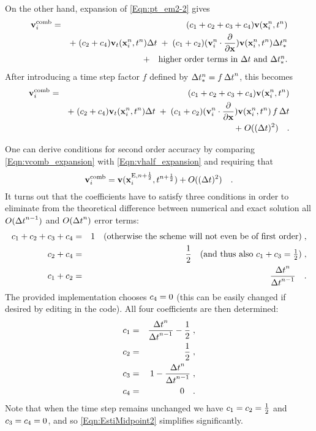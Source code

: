 \begin{itemize}
On the other hand, expansion of \eqref{Eqn:pt_em2-2} gives
\begin{eqnarray}
{\bf v}_i^{\mathrm{comb}} &=& 
(c_1+c_2+c_3+c_4) {\bf v}({\bf x}_i^{n},t^{n}) \nonumber\\
&& +\;
   (c_2 +    c_4) {\bf v}_t({\bf x}_i^{n},t^{n}) {\Delta t} \;+\;
  (c_1+c_2 )  ({\bf v}_i^{n} \cdot \frac{\partial}{\partial {\bf x}}) {\bf v}({\bf x}_i^{n},t^{n}) \Delta t_{*}^{n}  \nonumber\\
&& \quad +    \quad    \mbox{higher order terms in ${\Delta t}$ and $\Delta t_{*}^{n}$.} \nonumber
\end{eqnarray}
After introducing a  time step factor $f$ defined by
$\Delta t_{*}^{n} = f\,{\Delta t}^{n}$, this becomes
\begin{eqnarray}
    \label{Eqn:vcomb_expansion}
{\bf v}_i^{\mathrm{comb}} &=& 
(c_1+c_2+c_3+c_4) {\bf v}({\bf x}_i^{n},t^{n}) \\
&& +\;
   (c_2 +    c_4) {\bf v}_t({\bf x}_i^{n},t^{n}) {\Delta t} \;+\;
  (c_1+c_2 )({\bf v}_i^{n} \cdot \frac{\partial}{\partial {\bf x}}) {\bf v}({\bf x}_i^{n},t^{n}) \,f\,{\Delta t}  \nonumber\\
&& \quad  +  \; O(({\Delta t})^2)\quad. \nonumber
\end{eqnarray}


One can derive conditions for second order accuracy by comparing
\eqref{Eqn:vcomb_expansion} with \eqref{Eqn:vhalf_expansion} and requiring that
\begin{equation}
{\bf v}_i^{\mathrm{comb}} =  {\bf v}({\bf x}_i^{{\mathrm{E}},n+\frac12},t^{n+\frac12}) +  O(({\Delta t})^2)\quad.
\end{equation}
It turns out that the coefficients have to satisfy three conditions
in order to eliminate from the theoretical difference between 
numerical and exact solution
all $O({\Delta t}^{n-1})$ and $O({\Delta t}^{n})$ error terms:
\begin{eqnarray*}
   c_1+c_2+c_3+c_4 &=& 1  \quad  \mbox{(otherwise the scheme will not even be of first order)}\;,\\
      c_2   +c_4 &=& \frac12 \quad  \mbox{(and thus also $c_1+c_3=\frac12$)}\;, \\ 
   c_1+c_2       &=& \frac{ {\Delta t}^n } { {\Delta t}^{n-1} } \quad.
\end{eqnarray*}
The provided implementation chooses $c_4=0$ (this can be easily changed if desired by editing in the code).
All four coefficients are then determined:
     \begin{eqnarray*}
c_1&=&\frac{ {\Delta t}^n } { {\Delta t}^{n-1} } - \frac12\;,\\
c_2&=&\frac12\;,\\
c_3&=&1 - \frac{ {\Delta t}^n } { {\Delta t}^{n-1} }\;,\\
c_4&=&0\quad.
      \end{eqnarray*}
Note that when the time step remains unchanged we have $c_1=c_2=\frac12$ and $c_3=c_4=0$,
and so \eqref{Eqn:EstiMidpoint2} simplifies significantly.




\end{itemize}
